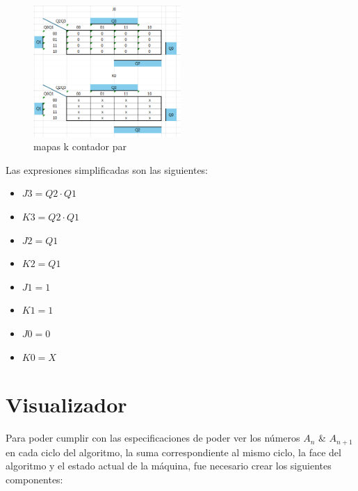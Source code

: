 \documentclass{article}
\begin{document}
\begin{figure}[h] %
    \centering
    \includegraphics[width=0.5\textwidth]{imagenes/mapask_contador_par_3.png} %
    \caption{mapas k contador par} %
    \label{fig:mapaskcontadorpar} %
\end{figure}
Las expresiones simplificadas son las siguientes:
\begin{itemize}
    \item $J3 = Q2 \cdot Q1$
    \item $K3 = Q2 \cdot Q1$
    \item $J2 = Q1$
    \item $K2 = Q1$
    \item $J1 = 1$
    \item $K1 = 1$
    \item $J0 = 0$
    \item $K0 = X$
\end{itemize}

\section{Visualizador}
Para poder cumplir con las especificaciones de poder ver los números $A_n$ \& $A_{n+1}$ en cada ciclo 
del algoritmo, la suma correspondiente al mismo ciclo, la face del algoritmo y el estado actual de la máquina, 
fue necesario crear los siguientes componentes:
\end{document}
